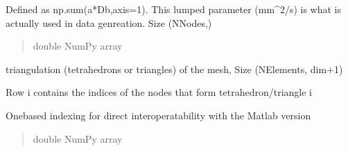 \documentclass[letterpaper,10pt,english]{sphinxmanual}
\begin{document}
\begin{fulllineitems}
\begin{fulllineitems}
\begin{quote}
\begin{description}
\end{description}\end{quote}

\end{fulllineitems}


\begin{fulllineitems}
\label{\detokenize{_autosummary/nirfasterff.base.dcs_mesh.dcsmesh:nirfasterff.base.dcs_mesh.dcsmesh.aDb}}
\pysigstartsignatures
\pysigline
{}
\pysigstopsignatures
\sphinxAtStartPar
Defined as np.sum(a*Db,axis=1). This lumped parameter (mm\textasciicircum{}2/s) is what is actually used in data genreation. Size (NNodes,)
\begin{quote}\begin{description}
\sphinxAtStartPar
double NumPy array

\end{description}\end{quote}

\end{fulllineitems}


\begin{fulllineitems}
\label{\detokenize{_autosummary/nirfasterff.base.dcs_mesh.dcsmesh:nirfasterff.base.dcs_mesh.dcsmesh.elements}}
\pysigstartsignatures
\pysigline
{}
\pysigstopsignatures
\sphinxAtStartPar
triangulation (tetrahedrons or triangles) of the mesh, Size (NElements, dim+1)

\sphinxAtStartPar
Row i contains the indices of the nodes that form tetrahedron/triangle i

\sphinxAtStartPar
One\sphinxhyphen{}based indexing for direct interoperatability with the Matlab version
\begin{quote}\begin{description}
\sphinxAtStartPar
double NumPy array

\end{description}\end{quote}

\end{fulllineitems}


\end{fulllineitems}
\end{document}
